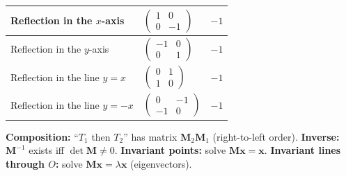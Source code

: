 \documentclass[11pt]{article}
\begin{document}
\begin{methode}
\begin{center}
\begin{tabularx}{\linewidth}{|l|X|c|}
Reflection in the $x$-axis & $\begin{pmatrix} 1 & 0 \\ 0 & -1 \end{pmatrix}$ & $-1$ \\ \hline
Reflection in the $y$-axis & $\begin{pmatrix} -1 & 0 \\ 0 & 1 \end{pmatrix}$ & $-1$ \\ \hline
Reflection in the line $y=x$ & $\begin{pmatrix} 0 & 1 \\ 1 & 0 \end{pmatrix}$ & $-1$ \\ \hline
Reflection in the line $y=-x$ & $\begin{pmatrix} 0 & -1 \\ -1 & 0 \end{pmatrix}$ & $-1$ \\ \hline
\end{tabularx}
\end{center}

\textbf{Composition:} ``$T_1$ then $T_2$'' has matrix $\mathbf{M}_2 \mathbf{M}_1$ (right-to-left order).
\textbf{Inverse:} $\mathbf{M}^{-1}$ exists iff $\det\mathbf{M} \ne 0$.
\textbf{Invariant points:} solve $\mathbf{M}\mathbf{x} = \mathbf{x}$. \textbf{Invariant lines through $O$:} solve $\mathbf{M}\mathbf{x} = \lambda \mathbf{x}$ (eigenvectors).
\end{methode}
\end{document}
